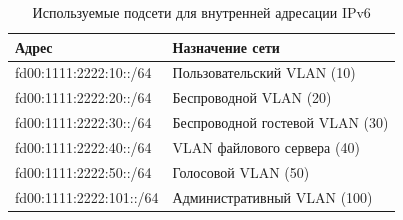     \begin{longtable}{| >{\raggedright}m{}
                | >{\centering\arraybackslash}m{}|}
    \caption{Используемые подсети для внутренней адресации IPv6} \label{table:func:V6VLAN} \\
    \hline
    \centering\arraybackslash Адрес
    & \centering\arraybackslash Назначение сети \\
    \hline
    \endhead
    fd00:1111:2222:10::/64 &
    Пользовательский VLAN (10)
    \\
    \hline
    fd00:1111:2222:20::/64 &
    Беспроводной VLAN (20)
    \\
    \hline
    fd00:1111:2222:30::/64 &
    Беспроводной гостевой VLAN (30)
    \\
    \hline
    fd00:1111:2222:40::/64 &
    VLAN файлового сервера (40)
    \\
    \hline
    fd00:1111:2222:50::/64 &
    Голосовой VLAN (50)
    \\
    \hline
    fd00:1111:2222:101::/64 &
    Административный VLAN (100)
    \\
    \hline
    \end{longtable}


